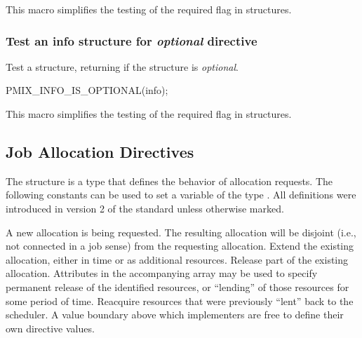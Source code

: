 This macro simplifies the testing of the required flag in  structures.

\subsubsection{Test an info structure for \textit{optional} directive}

\summary

Test a  structure, returning  if the structure is \textit{optional}.

\cspecificstart
\begin{codepar}
PMIX_INFO_IS_OPTIONAL(info);
\end{codepar}
\cspecificend

\begin{arglist}
\end{arglist}

This macro simplifies the testing of the required flag in  structures.


\subsection{Job Allocation Directives}

The  structure is a  type that defines the behavior of allocation requests.
The following constants can be used to set a variable of the type . All definitions were introduced in version 2 of the standard unless otherwise marked.

\begin{constantdesc}
%
A new allocation is being requested.
The resulting allocation will be disjoint (i.e., not connected in a job sense) from the requesting allocation.
%
Extend the existing allocation, either in time or as additional resources.
%
Release part of the existing allocation.
Attributes in the accompanying  array may be used to specify permanent release of the identified resources, or ``lending'' of those resources for some period of time.
%
Reacquire resources that were previously ``lent'' back to the scheduler.
%
A value boundary above which implementers are free to define their own directive values.
%
\end{constantdesc}


